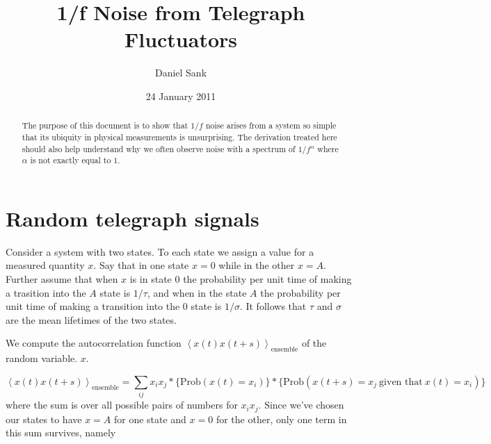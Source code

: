 \documentclass{article}
\title{1/f Noise from Telegraph Fluctuators}
\author{Daniel Sank}
\date{24 January 2011}
\newcommand{\avg}[1]{\left \langle #1 \right \rangle}
\begin{document}
\maketitle

\begin{abstract}
The purpose of this document is to show that $1/f$ noise arises from a system so simple that its ubiquity in physical measurements is unsurprising.
The derivation treated here should also help understand why we often observe noise with a spectrum of $1/f^{\alpha}$ where $\alpha$ is not exactly equal to $1$.
\end{abstract}

\section{Random telegraph signals}

Consider a system with two states. To each state we assign a value for a measured quantity $x$.
Say that in one state $x=0$ while in the other $x=A$.
Further assume that when $x$ is in state $0$ the probability per unit time of making a trasition into the $A$ state is $1/\tau$, and when in the state $A$ the probability per unit time of making a transition into the $0$ state is $1/\sigma$.
It follows that $\tau$ and $\sigma$ are the mean lifetimes of the two states.

We compute the autocorrelation function $\avg{x(t)x(t+s)}_{\textrm{ensemble}}$ of the random variable. $x$.

\begin{equation}
\avg{x(t)x(t+s)}_{\textrm{ensemble}}=\sum_{ij}x_{i}x_{j}*\{\textrm{Prob}(x(t)=x_{i})\}*\{\textrm{Prob}(x(t+s)=x_{j}~\textrm{given that}~x(t)=x_{i})\}
\end{equation}
where the sum is over all possible pairs of numbers for $x_i x_j$.
Since we've chosen our states to have $x=A$ for one state and $x=0$ for the other, only one term in this sum survives, namely
\end{document}
